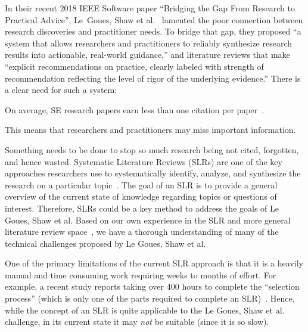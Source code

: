 
 In their recent   2018 IEEE Software paper ``Bridging the Gap
From Research to Practical Advice'', 
Le~Goues, Shaw et al.~\cite{Goues18}
  lamented the poor connection between research discoveries and practitioner needs. To bridge that
 gap, they proposed  ``a system that allows researchers and
practitioners to reliably synthesize research results into actionable, real-world guidance,'' and literature reviews that make ``explicit recommendations on practice,
clearly labeled with strength of recommendation reflecting the level of rigor of the underlying evidence.''
There is a clear need for such a system: 
\bi
\item
On average, SE research   papers  earn less than one citation per paper~\cite{Mathew_2018}.
\item
This means that researchers and practitioners may miss important information.  
\item
Something needs to be done to stop so much research being not cited, forgotten, and hence wasted. 
\ei
Systematic Literature Reviews (SLRs) are one of the key approaches researchers use to systematically identify, analyze, and synthesize the research on a particular topic~\cite{Kitchenham:04,Kitchenham_Charters:07,Kitchenham-etal:04}.
The goal of an SLR is to provide a general overview of the current state of knowledge regarding topics or questions of interest.
Therefore, SLRs could be a key method to address the goals of 
Le  Goues,  Shaw  et  al.
Based on our own experience in the SLR and more general literature review space~\cite{Yu2018,Yu2019,Mathew_2018,mathewSoft18,Menzies89,hassler2014outcomes,%
carver2013identifying,%
hassler2016identification,%
carver13z,%
Kakar_Carver_2012,%
Carver-etal:13,%
Al-Zubidy-Carver:14},
we have a thorough understanding of many of the technical challenges proposed by Le  Goues,  Shaw  et  al.

One of the primary limitations of the current SLR approach is that it is a heavily manual and time consuming work requiring weeks to months of effort.
For example, 
a recent study reports taking over 400 hours to complete the ``selection process'' (which is only one of the parts required to complete  an SLR)~\cite{Hassler:14}. 
Hence, while the concept of an SLR is quite applicable to the Le  Goues,  Shaw  et  al. challenge, in its current state it may {\em not} be suitable (since it is so slow).

